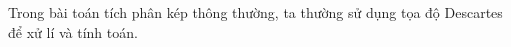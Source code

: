 \documentclass[preview]{standalone}
\begin{document}
\begin{center}
Trong bài toán tích phân kép thông thường, ta thường sử dụng tọa độ Descartes để xử lí và tính toán.
\end{center}
\end{document}
